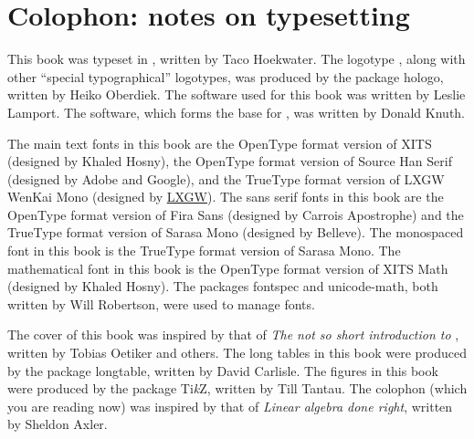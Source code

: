 \documentclass[../libro.tex]{subfiles}
\begin{document}
\ifSubfilesClassLoaded{\backmatter}{}

\chapter{Colophon: notes on typesetting}

\begingroup
\setlength{\parindent}{1.5em}%

\providecommand*{\typesettingengine}{whatever}
\providecommand*{\authoroftypesettingengine}{whomever}
\ifxetex
\renewcommand*{\typesettingengine}{\hologo{XeLaTeX}}
\renewcommand*{\authoroftypesettingengine}{Jonathan Kew}
\fi
\ifluatex
\renewcommand*{\typesettingengine}{\hologo{LuaLaTeX}}
\renewcommand*{\authoroftypesettingengine}{Taco Hoekwater}
\fi

This book was typeset in \typesettingengine{},
written by \authoroftypesettingengine{}.
The logotype \typesettingengine{},
along with other ``special typographical'' logotypes,
was produced by the  package \textsf{hologo},
written by Heiko Oberdiek.
The  software used for this book
was written by Leslie Lamport.
The  software,
which forms the base for ,
was written by Donald Knuth.

The main text fonts in this book are
the OpenType format version of
XITS (designed by Khaled Hosny),
the OpenType format version of
Source Han Serif (designed by Adobe and Google),
and the TrueType format version of
LXGW WenKai Mono (designed by
\href{https://github.com/lxgw/LxgwWenKai}{LXGW}).
The sans serif fonts in this book are
the OpenType format version of
Fira Sans (designed by Carrois Apostrophe)
and the TrueType format version of
Sarasa Mono (designed by Belleve).
The monospaced font in this book is
the TrueType format version of
Sarasa Mono.
The mathematical font in this book is
the OpenType format version of
XITS Math (designed by Khaled Hosny).
The \typesettingengine{} packages
\textsf{fontspec} and \textsf{unicode-math},
both written by Will Robertson,
were used to manage fonts.

The cover of this book was inspired by
that of \textit{The not so short introduction to },
written by Tobias Oetiker and others.
The long tables in this book were produced
by the  package \textsf{longtable},
written by David Carlisle.
The figures in this book were produced
by the  package \textsf{Ti\textit{k}Z},
written by Till Tantau.
The colophon (which you are reading now)
was inspired by that of
\textit{Linear algebra done right},
written by Sheldon Axler.
\end{document}
